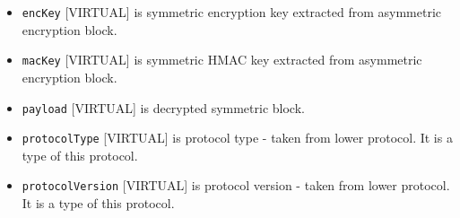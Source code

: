 \documentclass[a4paper,10pt]{article}
\begin{document}
\begin{itemize}
Note that it is a symmetric technique so attacker can still create packets with valid HMAC. Digital signature 
has to be verified (mac key is signed as well).

\begin{itemize}
 \item \verb#protocolType#
 \item \verb#protocolVersion#
 \item \verb#ampType#
 \item \verb#ampVersion#
 \item \verb#sequenceNumber#
 \item \verb#randomNonce#
 \item \verb#sender#
 \item \verb#destination#
 \item \verb#destinationType#
 \item \verb#iv#, initialization vector for symmetric encryption.
 \item \verb#encKey01#, symmetric encryption key for the symmetric encryption block.
 \item \verb#macKey01#, hmac symmetric key.
 \item \verb#easymBlock#
 \item \verb#easymBlockVersion#
 \item \verb#esymBlock#
 \item \verb#esymBlockVersion#
\end{itemize}
  
$
hmac = HMAC(macKey01, protocolType:protocolVersion:ampType:ampVersion:sequenceNumber:randomNonce:sender:
destination:destinationType:iv:encKey01:macKey01:easymBlock:easymBlockVersion:esymBlock:esymBlockVersion)) 
$

\item \verb#encKey# [VIRTUAL] is symmetric encryption key extracted from asymmetric encryption block. 

\item \verb#macKey# [VIRTUAL] is symmetric HMAC key extracted from asymmetric encryption block. 
 
\item \verb#payload# [VIRTUAL] is decrypted symmetric block.

\item \verb#protocolType# [VIRTUAL] is protocol type - taken from lower protocol. It is a type of this protocol.

\item \verb#protocolVersion# [VIRTUAL] is protocol version - taken from lower protocol. It is a type of this protocol.

\end{itemize}
\end{document}
